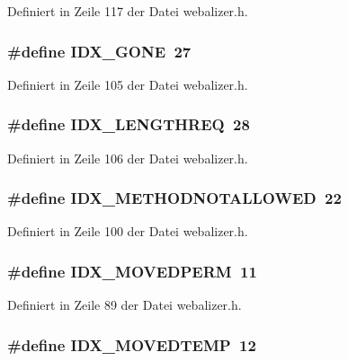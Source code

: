Definiert in Zeile 117 der Datei webalizer.h.
\subsubsection{\setlength{\rightskip}{0pt plus 5cm}\#define IDX\_\-GONE~27}\label{webalizer_8h_016b0abec5b38a6587c1efdc0220b768}




Definiert in Zeile 105 der Datei webalizer.h.
\subsubsection{\setlength{\rightskip}{0pt plus 5cm}\#define IDX\_\-LENGTHREQ~28}\label{webalizer_8h_81cd1be9f15877380c00d1c71bd511ff}




Definiert in Zeile 106 der Datei webalizer.h.
\subsubsection{\setlength{\rightskip}{0pt plus 5cm}\#define IDX\_\-METHODNOTALLOWED~22}\label{webalizer_8h_41fb3f3f6b1da41411b493a2dd061beb}




Definiert in Zeile 100 der Datei webalizer.h.
\subsubsection{\setlength{\rightskip}{0pt plus 5cm}\#define IDX\_\-MOVEDPERM~11}\label{webalizer_8h_dfb37d5b32200232d0b76ecea8f26c84}




Definiert in Zeile 89 der Datei webalizer.h.
\subsubsection{\setlength{\rightskip}{0pt plus 5cm}\#define IDX\_\-MOVEDTEMP~12}\label{webalizer_8h_f6cbf62366bb52a3609fd1e37f9cda52}




